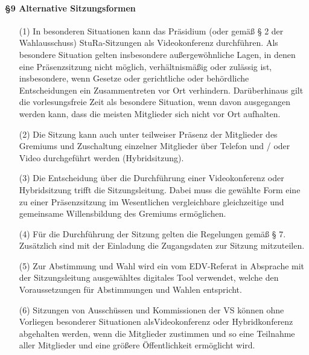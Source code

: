         \paragraph{§9 Alternative Sitzungsformen}
            \begin{itemize}
                \item[(1)] In besonderen Situationen kann das Präsidium (oder gemäß § 2 der Wahlausschuss) StuRa-Sitzungen als Videokonferenz durchführen. Als besondere Situation gelten insbesondere außergewöhnliche Lagen, in denen eine Präsenzsitzung nicht möglich, verhältnismäßig oder zulässig ist, insbesondere, wenn Gesetze oder gerichtliche oder behördliche Entscheidungen ein Zusammentreten vor Ort verhindern. Darüberhinaus gilt die vorlesungsfreie Zeit als besondere Situation, wenn davon ausgegangen werden kann, dass die meisten Mitglieder sich nicht vor Ort aufhalten.
                \item[(2)] Die Sitzung kann auch unter teilweiser Präsenz der Mitglieder des Gremiums und Zuschaltung einzelner Mitglieder über Telefon und / oder Video durchgeführt werden (Hybridsitzung).
                \item[(3)] Die Entscheidung über die Durchführung einer Videokonferenz oder Hybridsitzung trifft die Sitzungsleitung. Dabei muss die gewählte Form eine zu einer Präsenzsitzung im Wesentlichen vergleichbare gleichzeitige und gemeinsame Willensbildung des Gremiums ermöglichen.
                \item[(4)] Für die Durchführung der Sitzung gelten die Regelungen gemäß § 7. Zusätzlich sind mit der Einladung die Zugangsdaten zur Sitzung mitzuteilen.
                \item[(5)] Zur Abstimmung und Wahl wird ein vom EDV-Referat in Absprache mit der Sitzungsleitung ausgewähltes digitales Tool verwendet, welche den Voraussetzungen für Abstimmungen und Wahlen entspricht.
                \item[(6)] Sitzungen von Ausschüssen und Kommissionen der VS können ohne Vorliegen besonderer Situationen alsVideokonferenz oder Hybridkonferenz abgehalten werden, wenn die Mitglieder zustimmen und so eine Teilnahme aller Mitglieder und eine größere Öffentlichkeit ermöglicht wird.
            \end{itemize}
